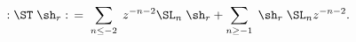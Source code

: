 \begin{equation}\label{normord}
{} :\ST\;\sh_r:\;\, = \;\sum_{n\leq -2} \;z^{-n-2}\SL_n \;
\sh_r+\sum_{n\geq -1}
\;\sh_r\;\SL_nz^{-n-2}.
\end{equation}

